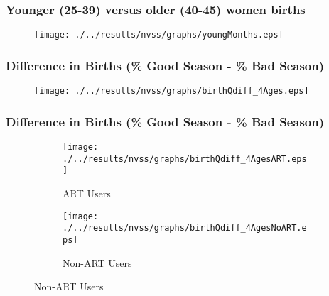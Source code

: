 \documentclass[10pt,letterpaper,subeqn]{beamer}
\begin{document}
\begin{frame}
\frametitle{Younger (25-39) versus older (40-45) women births}
\begin{figure}[htpb!]
\centering
\label{bqFig:YoungvOld}
  \centering
  \texttt{[image: ./../results/nvss/graphs/youngMonths.eps]}
\end{figure}
\end{frame}











\begin{frame}
\frametitle{Difference in Births (\% Good Season - \% Bad Season)}
\begin{figure}[htpb!]
  \begin{center}
  \label{fig:NVSSbirthsAges}
  \texttt{[image: ./../results/nvss/graphs/birthQdiff\_4Ages.eps]}
  \end{center}
\end{figure}
\end{frame}


\begin{frame}
\frametitle{Difference in Births (\% Good Season - \% Bad Season)}
\begin{figure}[htpb!]
\begin{center}
\label{fig:birthDiffART}
\begin{subfigure}{.5\textwidth}
  \centering
  \texttt{[image: ./../results/nvss/graphs/birthQdiff\_4AgesART.eps]}
  \caption{ART Users}
  \label{fig:DiffNoART}
\end{subfigure}%
\begin{subfigure}{.5\textwidth}
  \centering
  \texttt{[image: ./../results/nvss/graphs/birthQdiff\_4AgesNoART.eps]}
  \caption{Non-ART Users}
  \label{fig:DiffART}
\end{subfigure}
\end{center}
\end{figure}
\end{frame}
\end{document}
